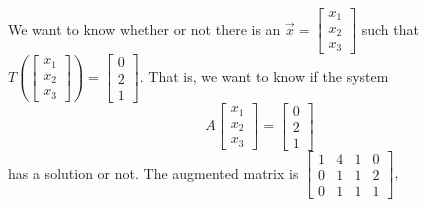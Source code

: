 \begin{SaveQuestion}[
        key=ch2-lintrans-rowredsurj-sbg,
        prompt={Let $T:\mathbb R^3 \rightarrow \mathbb R^3$ be the linear transformation given by left multiplication by $\begin{bmatrix} 1  & 4 & 1 \\ 0 & 1 & 1\\ 0 &  1&1  \end{bmatrix}.$ Use row-reduction to determine whether or not there is an vector $\vec x$ such that $T(\vec x) = \begin{bmatrix} 0\\ 2 \\ 1  \end{bmatrix}.$}
][ch2-CON-surinj] %
    We want to know whether or not there is an $\vec x =  \begin{bmatrix} x_1\\ x_2 \\ x_3  \end{bmatrix}$ such that $T( \begin{bmatrix} x_1\\ x_2 \\ x_3  \end{bmatrix}) =  \begin{bmatrix} 0\\ 2 \\ 1  \end{bmatrix}.$ That is, we want to know if the system 
			$$  A \begin{bmatrix} x_1\\ x_2 \\ x_3  \end{bmatrix} =  \begin{bmatrix} 0\\ 2 \\ 1  \end{bmatrix}
			$$
			has a solution or not. 
			The augmented matrix is 
			$\begin{bmatrix} 1  & 4 & 1 & 0 \\ 0 & 1 & 1 & 2 \\ 0 &  1&1 & 1 \end{bmatrix},$ 

\end{SaveQuestion}
